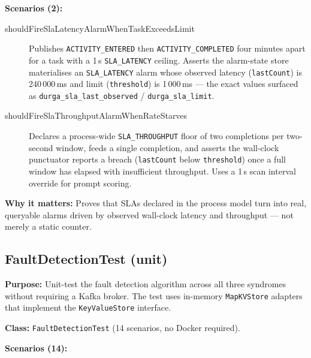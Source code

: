 \textbf{Scenarios (2):}

\begin{description}

\item[shouldFireSlaLatencyAlarmWhenTaskExceedsLimit] Publishes
\texttt{ACTIVITY\_ENTERED} then \texttt{ACTIVITY\_COMPLETED} four minutes apart for a
task with a 1\,s \texttt{SLA\_LATENCY} ceiling. Asserts the alarm-state store
materialises an \texttt{SLA\_LATENCY} alarm whose observed latency
(\texttt{lastCount}) is 240\,000\,ms and limit (\texttt{threshold}) is 1\,000\,ms ---
the exact values surfaced as \texttt{durga\_sla\_last\_observed} /
\texttt{durga\_sla\_limit}.

\item[shouldFireSlaThroughputAlarmWhenRateStarves] Declares a process-wide
\texttt{SLA\_THROUGHPUT} floor of two completions per two-second window, feeds a
single completion, and asserts the wall-clock punctuator reports a breach
(\texttt{lastCount} below \texttt{threshold}) once a full window has elapsed with
insufficient throughput. Uses a 1\,s scan interval override for prompt scoring.

\end{description}

\textbf{Why it matters:} Proves that SLAs declared in the process model turn into
real, queryable alarms driven by observed wall-clock latency and throughput ---
not merely a static counter.


\subsection{FaultDetectionTest (unit)}
\label{it:faultDetection}

\textbf{Purpose:} Unit-test the fault detection algorithm across all three
syndromes without requiring a Kafka broker. The test uses in-memory
\texttt{MapKVStore} adapters that implement the \texttt{KeyValueStore}
interface.

\textbf{Class:} \texttt{FaultDetectionTest} (14 scenarios, no Docker required).

\textbf{Scenarios (14):}

